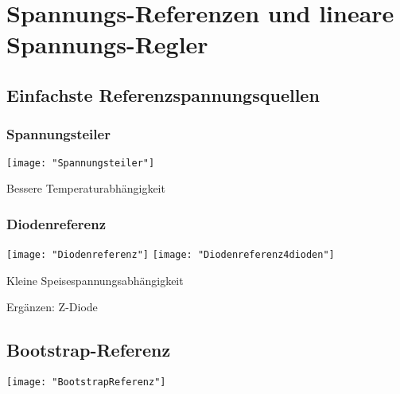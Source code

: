 \section{Spannungs-Referenzen und lineare Spannungs-Regler}
\subsection{Einfachste Referenzspannungsquellen}
\subsubsection{Spannungsteiler}
\begin{minipage}[t]{0.3\textwidth}
	\vspace{0pt}								%
	\texttt{[image: "Spannungsteiler"]}
\end{minipage}\hspace{0.05\textwidth}
\begin{minipage}[t]{0.65\textwidth}
	\vspace{0pt}								%
	Bessere Temperaturabhängigkeit
	
\end{minipage}
\vspace{2mm}

\subsubsection{Diodenreferenz}
\begin{minipage}[t]{0.3\textwidth}
	\vspace{0pt}								%
	\texttt{[image: "Diodenreferenz"]}
	\texttt{[image: "Diodenreferenz4dioden"]}
\end{minipage}\hspace{0.05\textwidth}
\begin{minipage}[t]{0.65\textwidth}
	\vspace{0pt}								%
	Kleine Speisespannungsabhängigkeit
	
	
	Ergänzen: Z-Diode
\end{minipage}
\vspace{2mm}


\subsection{Bootstrap-Referenz}
\begin{minipage}[t]{0.3\textwidth}
	\vspace{0pt}								%
	\texttt{[image: "BootstrapReferenz"]}
\end{minipage}\hspace{0.05\textwidth}
\begin{minipage}[t]{0.65\textwidth}
	\vspace{0pt}								%
	
\end{minipage}
\vspace{2mm}


